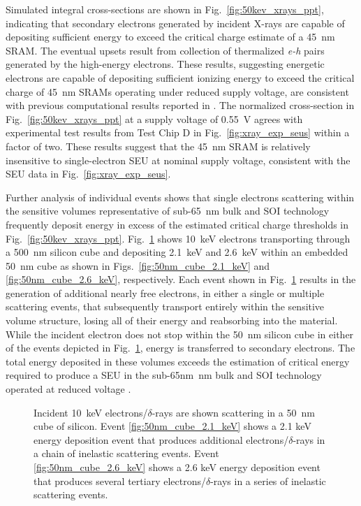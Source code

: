 Simulated integral cross-sections are shown in Fig.~\ref{fig:50kev_xrays_ppt}, indicating that secondary electrons generated by incident X-rays are capable of depositing sufficient energy to exceed the critical charge estimate of a 45~nm SRAM. 
The eventual upsets result from collection of thermalized \emph{e-h} pairs generated by the high-energy electrons. 
These results, suggesting energetic electrons are capable of depositing sufficient ionizing energy to exceed the critical charge of 45~nm SRAMs operating under reduced supply voltage, are consistent with previous computational results reported in \cite{King:2010cu, King:2012cb}. 
The normalized cross-section in Fig.~\ref{fig:50kev_xrays_ppt} at a supply voltage of 0.55~V agrees with experimental test results from Test Chip D in Fig.~\ref{fig:xray_exp_seus} within a factor of two. 
These results suggest that the 45~nm SRAM is relatively insensitive to single-electron SEU at nominal supply voltage, consistent with the SEU data in Fig.~\ref{fig:xray_exp_seus}. 

Further analysis of individual events shows that single electrons scattering within the sensitive volumes representative of sub-65~nm bulk and SOI technology frequently deposit energy in excess of the estimated critical charge thresholds in Fig.~\ref{fig:50kev_xrays_ppt}.
Fig.~\ref{fig:50nm_cube_silicon} shows 10~keV electrons transporting through a 500~nm silicon cube and depositing 2.1~keV and 2.6~keV within an embedded 50~nm cube as shown in Figs.~\ref{fig:50nm_cube_2.1_keV} and \ref{fig:50nm_cube_2.6_keV}, respectively. 
Each event shown in Fig.~\ref{fig:50nm_cube_silicon} results in the generation of additional nearly free electrons, in either a single or multiple scattering events, that subsequently transport entirely within the sensitive volume structure, losing all of their energy and reabsorbing into the material.
While the incident electron does not stop within the 50~nm silicon cube in either of the events depicted in Fig.~\ref{fig:50nm_cube_silicon}, energy is transferred to secondary electrons.
The total energy deposited in these volumes exceeds the estimation of critical energy required to produce a SEU in the sub-65nm~nm bulk and SOI technology operated at reduced voltage \cite{Rodbell:2007vl}.
\begin{figure}[htbp]
        \centering
        \caption{Incident 10~keV electrons/$\delta$-rays are shown scattering in a 50~nm cube of silicon. Event \ref{fig:50nm_cube_2.1_keV} shows a 2.1 keV energy deposition event that produces additional electrons/$\delta$-rays in a chain of inelastic scattering events. Event \ref{fig:50nm_cube_2.6_keV} shows a 2.6 keV energy deposition event that produces several tertiary electrons/$\delta$-rays in a series of inelastic scattering events.}
        \label{fig:50nm_cube_silicon}
\end{figure}


